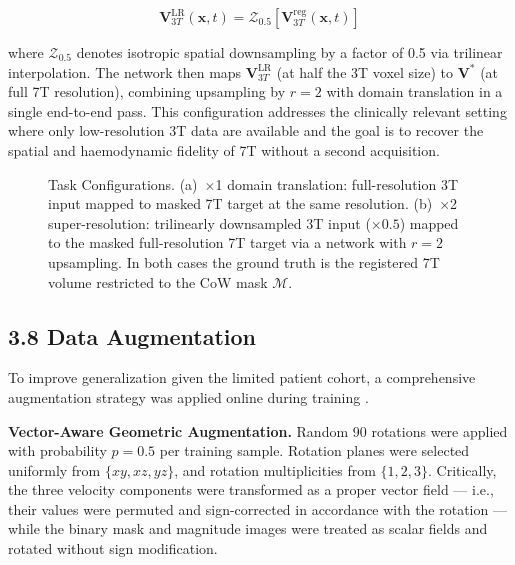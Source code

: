 \documentclass[11pt]{article}
\begin{document}
\begin{equation}
    \mathbf{V}^{\text{LR}}_{3T}(\mathbf{x}, t) =
        \mathcal{Z}_{0.5}\!\left[\mathbf{V}_{3T}^{\text{reg}}(\mathbf{x}, t)\right]
\end{equation}

where $\mathcal{Z}_{0.5}$ denotes isotropic spatial downsampling by a factor of 0.5 via trilinear interpolation. The network then maps $\mathbf{V}^{\text{LR}}_{3T}$ (at half the 3T voxel size) to $\mathbf{V}^{*}$ (at full 7T resolution), combining upsampling by $r = 2$ with domain translation in a single end-to-end pass. This configuration addresses the clinically relevant setting where only low-resolution 3T data are available and the goal is to recover the spatial and haemodynamic fidelity of 7T without a second acquisition.

\begin{figure}[!htbp]
    \centering
    \caption{Task Configurations. (a)~$\times$1 domain translation: full-resolution 3T input mapped to masked 7T target at the same resolution. (b)~$\times$2 super-resolution: trilinearly downsampled 3T input ($\times 0.5$) mapped to the masked full-resolution 7T target via a network with $r=2$ upsampling. In both cases the ground truth is the registered 7T volume restricted to the CoW mask $\mathcal{M}$.}
    \label{fig:tasks}
\end{figure}

\subsection*{3.8 Data Augmentation}

To improve generalization given the limited patient cohort, a comprehensive augmentation strategy was applied online during training \cite{zhao2019augmentation}.

\textbf{Vector-Aware Geometric Augmentation.} Random 90\textdegree{} rotations were applied with probability $p = 0.5$ per training sample. Rotation planes were selected uniformly from $\{xy, xz, yz\}$, and rotation multiplicities from $\{1, 2, 3\}$. Critically, the three velocity components were transformed as a proper vector field --- i.e., their values were permuted and sign-corrected in accordance with the rotation --- while the binary mask and magnitude images were treated as scalar fields and rotated without sign modification.
\end{document}
